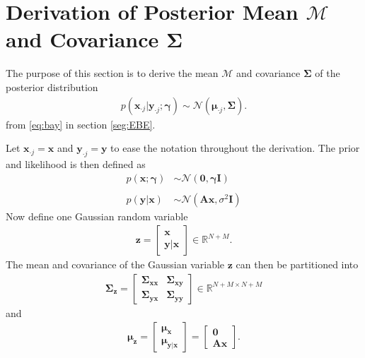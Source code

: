 \section{Derivation of Posterior Mean $\mathcal{M}$ and Covariance $\boldsymbol{\Sigma}$}\label{app_sec:mean_cov}
The purpose of this section is to derive the mean $\mathcal{M}$ and covariance $\boldsymbol{\Sigma}$ of the posterior distribution
\begin{align*}
p\left( \mathbf{x}_{\cdot j} \vert \mathbf{y}_{\cdot j} ; \boldsymbol{\gamma} \right) \sim \mathcal{N}(\boldsymbol{\mu}_{\cdot j} , \boldsymbol{\Sigma}).
\end{align*}
from \eqref{eq:bay} in section \ref{seg:EBE}. 

Let $\mathbf{x}_{\cdot j} = \mathbf{x}$ and $\mathbf{y}_{\cdot j} = \mathbf{y}$ to ease the notation throughout the derivation. The prior and likelihood is then defined as
\begin{align*}
p(\mathbf{x} ; \boldsymbol{\gamma}) &\sim \mathcal{N}(\mathbf{0}, \boldsymbol{\gamma} \mathbf{I} ) \\
& \\
p(\mathbf{y} \vert \mathbf{x}) &\sim \mathcal{N}(\mathbf{A}\mathbf{x}, \sigma^2 \mathbf{I})
\end{align*}
Now define one Gaussian random variable  
\begin{align*}
\mathbf{z} = \begin{bmatrix}
\mathbf{x} \\ 
\mathbf{y}\vert \mathbf{x} 
\end{bmatrix} \in \mathbb{R}^{N + M}.	
\end{align*}  
The mean and covariance of the Gaussian variable $\mathbf{z}$ can then be partitioned into 
\begin{align*}
\boldsymbol{\Sigma}_{\mathbf{z}} = 
\begin{bmatrix}
\boldsymbol{\Sigma}_{\mathbf{x}\mathbf{x}} & \boldsymbol{\Sigma}_{\mathbf{x}\mathbf{y}} \\ 
\boldsymbol{\Sigma}_{\mathbf{y}\mathbf{x}} & \boldsymbol{\Sigma}_{\mathbf{y}\mathbf{y}}
\end{bmatrix} 
\in \mathbb{R}^{N+M \times N+M}
\end{align*}
and
\begin{align*}
\boldsymbol{\mu}_{\mathbf{z}} = 
\begin{bmatrix}
\boldsymbol{\mu}_{\mathbf{x}} \\ 
\boldsymbol{\mu}_{\mathbf{y} \vert \mathbf{x}}
\end{bmatrix} 
= 
\begin{bmatrix}
\mathbf{0}  \\ 
\mathbf{A} \mathbf{x}
\end{bmatrix}.
\end{align*}
